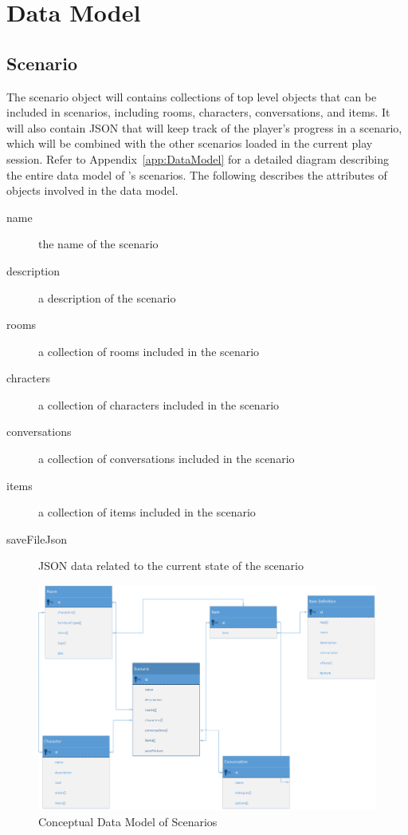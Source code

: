 \section{Data Model}
\subsection{Scenario}
The scenario object will contains collections of top level objects that can be included in scenarios, including rooms, characters, conversations, and items. It will also contain JSON that will keep track of the player's progress in a scenario, which will be combined with the  other scenarios loaded in the current play session. Refer to Appendix~\ref{app:DataModel} for a detailed diagram describing the entire data model of \ourgame{}'s scenarios. The following describes the attributes of objects involved in the data model.

\begin{description}
\item[name]{the name of the scenario}
\item[description]{a description of the scenario}
\item[rooms]{a collection of rooms included in the scenario}
\item[chracters]{a collection of characters included in the scenario}
\item[conversations]{a collection of conversations included in the scenario}
\item[items]{a collection of items included in the scenario}
\item[saveFileJson]{JSON data related to the current state of the scenario}
\end{description}

\begin{figure}[H]
\label{fig:conceptual_data_model}
\centering\includegraphics[width=.7\linewidth]{images/Conceptual_DataModel}
\caption{Conceptual Data Model of Scenarios}
\end{figure}

